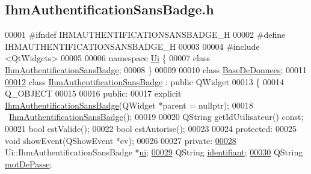 \hypertarget{_ihm_authentification_sans_badge_8h_source}{}\subsection{Ihm\+Authentification\+Sans\+Badge.\+h}
\label{_ihm_authentification_sans_badge_8h_source}

\begin{DoxyCode}
00001 \textcolor{preprocessor}{#ifndef IHMAUTHENTIFICATIONSANSBADGE\_H}
00002 \textcolor{preprocessor}{#define IHMAUTHENTIFICATIONSANSBADGE\_H}
00003 
00004 \textcolor{preprocessor}{#include <QtWidgets>}
00005 
00006 \textcolor{keyword}{namespace }\hyperlink{namespace_ui}{Ui} \{
00007 \textcolor{keyword}{class }\hyperlink{class_ihm_authentification_sans_badge}{IhmAuthentificationSansBadge};
00008 \}
00009 
00010 \textcolor{keyword}{class }\hyperlink{class_base_de_donnees}{BaseDeDonnees};
00011 
\hyperlink{class_ihm_authentification_sans_badge}{00012} \textcolor{keyword}{class }\hyperlink{class_ihm_authentification_sans_badge}{IhmAuthentificationSansBadge} : \textcolor{keyword}{public} QWidget
00013 \{
00014     Q\_OBJECT
00015 
00016 \textcolor{keyword}{public}:
00017     \textcolor{keyword}{explicit} \hyperlink{class_ihm_authentification_sans_badge}{IhmAuthentificationSansBadge}(QWidget *parent = \textcolor{keyword}{nullptr});
00018     ~\hyperlink{class_ihm_authentification_sans_badge}{IhmAuthentificationSansBadge}();
00019 
00020     QString getIdUtilisateur() \textcolor{keyword}{const};
00021     \textcolor{keywordtype}{bool} estValide();
00022     \textcolor{keywordtype}{bool} estAutorise();
00023 
00024 \textcolor{keyword}{protected}:
00025       \textcolor{keywordtype}{void} showEvent(QShowEvent *ev);
00026 
00027 \textcolor{keyword}{private}:
\hyperlink{class_ihm_authentification_sans_badge_a95e8a9d049b6e5f262b45e3362d2bbee}{00028}     Ui::IhmAuthentificationSansBadge *\hyperlink{class_ihm_authentification_sans_badge_a95e8a9d049b6e5f262b45e3362d2bbee}{ui};
\hyperlink{class_ihm_authentification_sans_badge_aff90fe3fcf957daa57ca0318a4b1a2d0}{00029}     QString \hyperlink{class_ihm_authentification_sans_badge_aff90fe3fcf957daa57ca0318a4b1a2d0}{identifiant}; 
\hyperlink{class_ihm_authentification_sans_badge_a3a5c5887be56c7f1b5dcd1bf824d09c4}{00030}     QString \hyperlink{class_ihm_authentification_sans_badge_a3a5c5887be56c7f1b5dcd1bf824d09c4}{motDePasse};

\end{DoxyCode}
